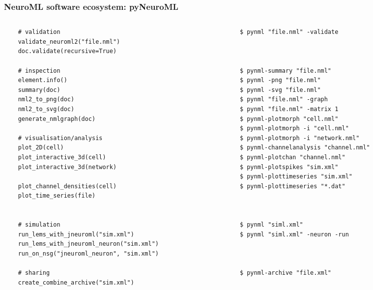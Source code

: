 \begin{frame}[fragile,t]
  \frametitle{NeuroML software ecosystem: pyNeuroML}
  \begin{columns}
    \begin{column}{0.5\textwidth}
      \begin{verbatim}
    # validation
    validate_neuroml2("file.nml")
    doc.validate(recursive=True)

    # inspection
    element.info()
    summary(doc)
    nml2_to_png(doc)
    nml2_to_svg(doc)
    generate_nmlgraph(doc)

    # visualisation/analysis
    plot_2D(cell)
    plot_interactive_3d(cell)
    plot_interactive_3d(network)

    plot_channel_densities(cell)
    plot_time_series(file)


    # simulation
    run_lems_with_jneuroml("sim.xml")
    run_lems_with_jneuroml_neuron("sim.xml")
    run_on_nsg("jneuroml_neuron", "sim.xml")

    # sharing
    create_combine_archive("sim.xml")
      \end{verbatim}
    \end{column}
    \begin{column}{0.5\textwidth}
      \begin{verbatim}
    $ pynml "file.nml" -validate



    $ pynml-summary "file.nml"
    $ pynml -png "file.nml"
    $ pynml -svg "file.nml"
    $ pynml "file.nml" -graph
    $ pynml "file.nml" -matrix 1
    $ pynml-plotmorph "cell.nml"
    $ pynml-plotmorph -i "cell.nml"
    $ pynml-plotmorph -i "network.nml"
    $ pynml-channelanalysis "channel.nml"
    $ pynml-plotchan "channel.nml"
    $ pynml-plotspikes "sim.xml"
    $ pynml-plottimeseries "sim.xml"
    $ pynml-plottimeseries "*.dat"



    $ pynml "siml.xml"
    $ pynml "siml.xml" -neuron -run



    $ pynml-archive "file.xml"
      \end{verbatim}
    \end{column}
  \end{columns}
\end{frame}
